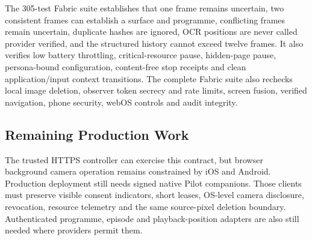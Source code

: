 The 305-test Fabric suite establishes that one frame remains uncertain, two consistent frames
can establish a surface and programme, conflicting frames remain uncertain,
duplicate hashes are ignored, OCR positions are never called provider verified,
and the structured history cannot exceed twelve frames. It also verifies low
battery throttling, critical-resource pause, hidden-page pause, persona-bound
configuration, content-free stop receipts and clean application/input context
transitions. The complete Fabric
suite also rechecks local image deletion, observer token secrecy and rate limits,
screen fusion, verified navigation, phone security, webOS controls and audit
integrity.

\subsection{Remaining Production Work}

The trusted HTTPS controller can exercise this contract, but browser background
camera operation remains constrained by iOS and Android. Production deployment
still needs signed native Pilot companions. Those clients must preserve visible
consent indicators, short leases, OS-level camera disclosure, revocation,
resource telemetry and the same source-pixel deletion boundary. Authenticated
programme, episode and playback-position adapters are also still needed where
providers permit them.
